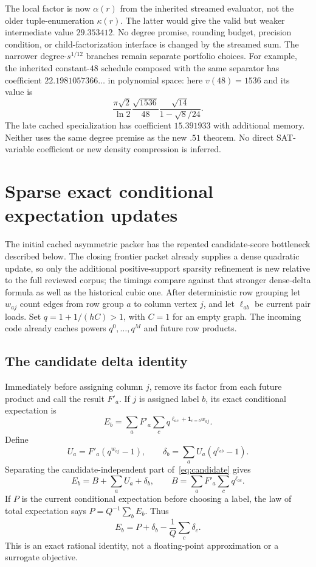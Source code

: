 \documentclass[11pt,letterpaper]{article}
\theoremstyle{remark}\newtheorem{remark}[theorem]{Remark}
\begin{document}
The local factor is now $\alpha(r)$ from the inherited streamed evaluator,
not the older tuple-enumeration $\kappa(r)$. The latter would give the valid but
weaker intermediate value $29.353412$. No degree promise, rounding budget,
precision condition, or child-factorization interface is changed by the streamed
sum. The narrower degree-$s^{1/12}$ branches remain separate portfolio choices.
For example, the inherited constant-$48$ schedule composed with the same
separator has coefficient $22.1981057366\ldots$ in polynomial space: here
$v(48)=1536$ and its value is
\[
 \frac{\pi\sqrt2}{\ln2}\frac{\sqrt{1536}}{48}
 \frac{\sqrt{14}}{1-\sqrt8/24}.
\]
The late cached specialization has coefficient $15.391933$ with additional
memory. Neither uses the same degree premise as the new $.51$ theorem.
No direct SAT-variable coefficient or new density compression is inferred.


\section{Sparse exact conditional expectation updates}
\label{sec:sparse}
The initial cached asymmetric packer has the repeated candidate-score bottleneck described below. The closing frontier packet already supplies a dense quadratic update, so only the additional positive-support sparsity refinement is new relative to the full reviewed corpus; the timings compare against that stronger dense-delta formula as well as the historical cubic one. After deterministic row grouping let $w_{aj}$ count edges from row group $a$ to column vertex $j$, and let $\ell_{ab}$ be current pair loads. Set $q=1+1/(hC)>1$, with $C=1$ for an empty graph. The incoming code already caches powers $q^0,\ldots,q^M$ and future row products.

\subsection{The candidate delta identity}
Immediately before assigning column $j$, remove its factor from each future product and call the result $F'_a$. If $j$ is assigned label $b$, its exact conditional expectation is
\begin{equation}\label{eq:candidate}
 E_b=\sum_a F'_a\sum_c q^{\ell_{ac}+\mathbf1_{c=b}w_{aj}}.
\end{equation}
Define
\[
 U_a=F'_a(q^{w_{aj}}-1),\qquad
 \delta_b=\sum_a U_a(q^{\ell_{ab}}-1).
\]
Separating the candidate-independent part of~\eqref{eq:candidate} gives
\[
 E_b=B+\sum_aU_a+\delta_b,
 \qquad B=\sum_aF'_a\sum_cq^{\ell_{ac}}.
\]
If $P$ is the current conditional expectation before choosing a label, the law of total expectation says $P=Q^{-1}\sum_bE_b$. Thus
\begin{equation}\label{eq:delta}
 E_b=P+\delta_b-\frac1Q\sum_c\delta_c.
\end{equation}
This is an exact rational identity, not a floating-point approximation or a surrogate objective.
\end{document}
